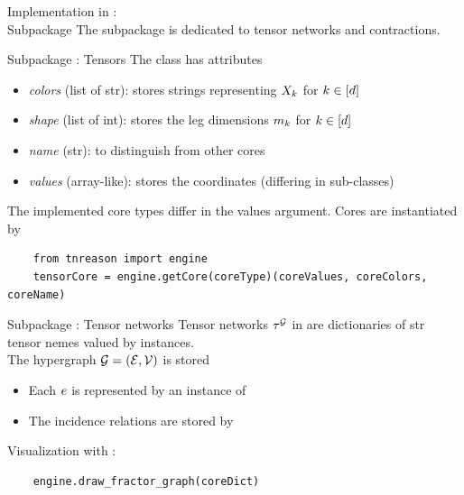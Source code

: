 \documentclass{beamer}
\begin{document}
    \begin{frame}{Implementation in \tnreason: \\
    Subpackage \spengine}
        The subpackage \spengine is dedicated to tensor networks and contractions.

        \begin{center}
        \end{center}
    \end{frame}

    \begin{frame}[fragile]{Subpackage \spengine{}: Tensors}
        The class  has attributes
        \begin{itemize}
            \item \emph{colors} (list of str): stores strings representing $X_{k}$ for $k\in[d]$
            \item \emph{shape} (list of int): stores the leg dimensions $m_{k}$ for $k\in[d]$
            \item \emph{name} (str): to distinguish from other cores
            \item \emph{values} (array-like): stores the coordinates (differing in sub-classes)
        \end{itemize}
        The implemented core types differ in the values argument.
        Cores are instantiated by
        \begin{verbatim}
    from tnreason import engine
    tensorCore = engine.getCore(coreType)(coreValues, coreColors, coreName)
        \end{verbatim}
    \end{frame}

    \begin{frame}[fragile]{Subpackage \spengine{}: Tensor networks}
        Tensor networks $\tau^{\mathcal{G}}$ in \tnreason{} are dictionaries  of str tensor nemes valued by  instances.
        \medskip \\
        The hypergraph $\mathcal{G}=(\mathcal{E},\mathcal{V})$ is stored
        \begin{itemize}
            \item Each $e$ is represented by an instance  of 
            \item The incidence relations are stored by 
        \end{itemize}
        \medskip
        Visualization with :
        \begin{verbatim}
    engine.draw_fractor_graph(coreDict)
        \end{verbatim}
    \end{frame}
\end{document}
